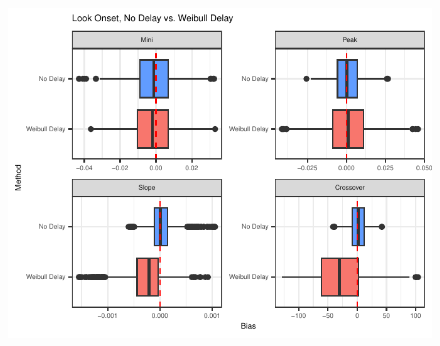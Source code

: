 \documentclass{beamer}
\providecommand{\cn}[1]{\textcolor{blue}{#1}}
\begin{document}
\begin{frame}
\begin{figure}[H]
\centering
\includegraphics{compare_bar_plot2.pdf}
\end{figure}
\end{frame}

%
%
\end{document}
